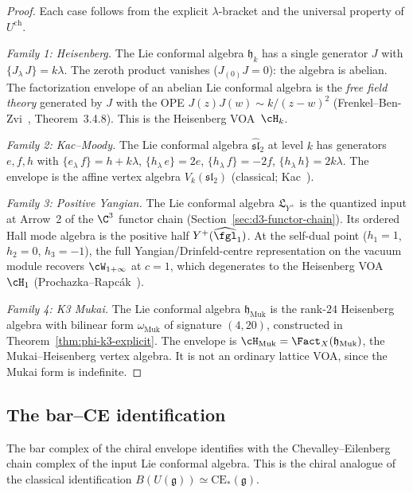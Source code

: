 \begin{proof}
Each case follows from the explicit $\lambda$-bracket and the universal property of $U^{\mathrm{ch}}$.

\emph{Family 1: Heisenberg.} The Lie conformal algebra $\mathfrak{h}_k$ has a single generator $J$ with $\{J_\lambda\, J\} = k\lambda$. The zeroth product vanishes ($J_{(0)}J = 0$): the algebra is abelian. The factorization envelope of an abelian Lie conformal algebra is the \emph{free field theory} generated by $J$ with the OPE $J(z)J(w) \sim k/(z-w)^2$ (Frenkel--Ben-Zvi~\cite{FrenkelBenZvi}, Theorem~3.4.8). This is the Heisenberg VOA~$\cH_k$.

\emph{Family 2: Kac--Moody.} The Lie conformal algebra $\widehat{\mathfrak{sl}}_2$ at level $k$ has generators $e, f, h$ with $\{e_\lambda\, f\} = h + k\lambda$, $\{h_\lambda\, e\} = 2e$, $\{h_\lambda\, f\} = -2f$, $\{h_\lambda\, h\} = 2k\lambda$. The envelope is the affine vertex algebra $V_k(\mathfrak{sl}_2)$ (classical; Kac~\cite{Kac}).

 \emph{Family 3: Positive Yangian.} The Lie conformal algebra $\mathfrak{L}_{Y^+}$ is the quantized input at Arrow~2 of the $\C^3$ functor chain (Section~\ref{sec:d3-functor-chain}). Its ordered Hall mode algebra is the positive half $Y^+(\widehat{\fgl}_1)$. At the self-dual point ($h_1 = 1$, $h_2 = 0$, $h_3 = -1$), the full Yangian/Drinfeld-centre representation on the vacuum module recovers $\cW_{1+\infty}$ at $c = 1$, which degenerates to the Heisenberg VOA $\cH_1$ (Prochazka--Rapc\'ak~\cite{ProchazkaRapcak}).

\emph{Family 4: K3 Mukai.} The Lie conformal algebra $\mathfrak{h}_{\mathrm{Muk}}$ is the rank-$24$ Heisenberg algebra with bilinear form $\omega_{\mathrm{Muk}}$ of signature $(4,20)$, constructed in Theorem~\ref{thm:phi-k3-explicit}. The envelope is $\cH_{\mathrm{Muk}} = \Fact_X(\mathfrak{h}_{\mathrm{Muk}})$, the Mukai--Heisenberg vertex algebra. It is not an ordinary lattice VOA, since the Mukai form is indefinite.
\end{proof}


\subsection{The bar--CE identification}
\label{subsec:bar-ce-envelope}

The bar complex of the chiral envelope identifies with the Chevalley--Eilenberg chain complex of the input Lie conformal algebra. This is the chiral analogue of the classical identification $B(U(\mathfrak{g})) \simeq \mathrm{CE}_*(\mathfrak{g})$.

